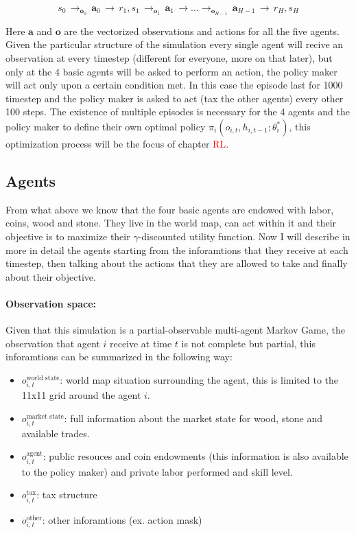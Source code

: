 \begin{equation*}
     s_0 \,  \rightarrow_{\boldsymbol{o}_0}\, \boldsymbol{a}_0 \,\rightarrow\, r_1 , s_1 \,\rightarrow_{\boldsymbol{o}_1}\, \boldsymbol{a}_1 \,\rightarrow ... \rightarrow_{\boldsymbol{o}_{H-1}}\, \boldsymbol{a}_{H-1} \,\rightarrow\, r_H , s_H
\end{equation*}

Here \( \boldsymbol{a} \) and \( \boldsymbol{o} \) are the vectorized observations and actions for all the five agents. Given the particular structure of the simulation every single agent will recive an observation at every timestep (different for everyone, more on that later), but only at the 4 basic agents will be asked to perform an action, the policy maker will act only upon a certain condition met. In this case the episode last for 1000 timestep and the policy maker is asked to act (tax the other agents) every other 100 steps. The existence of multiple episodes is necessary for the 4 agents and the policy maker to define their own optimal policy \( \pi_i(o_{i,t}, h_{i,t-1};\theta_i^*) \), this optimization process will be the focus of chapter \textcolor{red}{RL}.

\subsection{Agents}

From what above we know that the four basic agents are endowed with labor, coins, wood and stone. They live in the world map, can act within it and their objective is to maximize their $\gamma$-discounted utility function. Now I will describe in more in detail the agents starting from the inforamtions that they receive at each timestep, then talking about the actions that they are allowed to take and finally about their objective. 

\paragraph{Observation space:} Given that this simulation is a partial-observable multi-agent Markov Game, the observation that agent \( i \) receive at time \( t \) is not complete but partial, this inforamtions can be summarized in the following way:

\begin{itemize}
    \item \(o_{i,t}^{\text{world state}}\): world map situation surrounding the agent, this is limited to the 11x11 grid around the agent \( i \).
    \item \(o_{i,t}^{\text{market state}}\): full information about the market state for wood, stone and available trades.
    \item \(o_{i,t}^{\text{agent}}\): public resouces and coin endowments (this information is also available to the policy maker) and private labor performed and skill level.
    \item \( o_{i,t}^{\text{tax}} \): tax structure
    \item \( o_{i,t}^{\text{other}} \): other inforamtions (ex. action mask)
\end{itemize}
 
